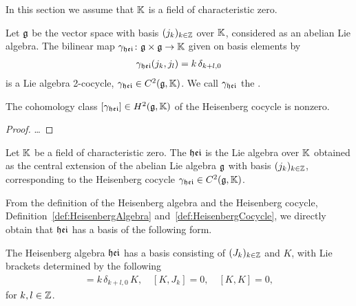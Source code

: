 In this section we assume that $\mathbb{K}$ is a field of characteristic zero.

\begin{definition}
  \label{def:HeisenbergCocycle}
  \leanok
  Let $\mathfrak{g}$ be the vector space with basis $(j_k)_{k \in \mathbb{Z}}$ over $\mathbb{K}$,
  considered as an abelian Lie algebra.
  The bilinear map ${\gamma}_{\mathfrak{hei}} \colon \mathfrak{g} \times \mathfrak{g} \to \mathbb{K}$
  given on basis elements by
  \begin{align*}
    {\gamma}_{\mathfrak{hei}}(j_k, j_l) = k \, \delta_{k+l,0}
  \end{align*}
  is a Lie algebra 2-cocycle, ${\gamma}_{\mathfrak{hei}} \in C^2(\mathfrak{g},\mathbb{K})$.
  We call ${\gamma}_{\mathfrak{hei}}$ the .
\end{definition}

\begin{lemma}
  \label{lem:HeisenbergCocycleNontrivial}
  \leanok
  The cohomology class $[{\gamma}_{\mathfrak{hei}}] \in H^2(\mathfrak{g},\mathbb{K})$
  of the Heisenberg cocycle is nonzero.
\end{lemma}
\begin{proof}
  \leanok
  \ldots
\end{proof}

\begin{definition}
  \label{def:HeisenbergAlgebra}
  \leanok
  Let $\mathbb{K}$ be a field of characteristic zero.
  The  $\mathfrak{hei}$ is the Lie algebra over $\mathbb{K}$
  obtained as the central extension of the abelian Lie algebra $\mathfrak{g}$
  with basis $(j_k)_{k \in \mathbb{Z}}$,
  corresponding to the Heisenberg cocycle ${\gamma}_{\mathfrak{hei}} \in C^2(\mathfrak{g},\mathbb{K})$.
\end{definition}

From the definition of the Heisenberg algebra and the Heisenberg cocycle,
Definition~\ref{def:HeisenbergAlgebra} and~\ref{def:HeisenbergCocycle},
we directly obtain that $\mathfrak{hei}$ has a basis of the following form.

\begin{definition}
  \label{def:HeisenbergBasis}
  \leanok
  The Heisenberg algebra $\mathfrak{hei}$ has a basis consisting of $(J_k)_{k \in \mathbb{Z}}$
  and $K$, with Lie brackets determined by the following
  \begin{align*}
    [J_k, J_l] = k \, \delta_{k+l,0} \, K , \quad
    [K, J_k] = 0 , \quad
    [K, K] = 0 ,
  \end{align*}
  for $k,l \in \mathbb{Z}$.
\end{definition}
